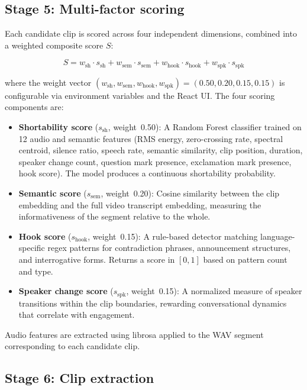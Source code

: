 \documentclass[ENG]{TFUOC}
\begin{document}
\subsection*{Stage 5: Multi-factor scoring}

Each candidate clip is scored across four independent dimensions, combined into a weighted composite score $S$:

\begin{equation}
S = w_{\text{sh}} \cdot s_{\text{sh}} + w_{\text{sem}} \cdot s_{\text{sem}} + w_{\text{hook}} \cdot s_{\text{hook}} + w_{\text{spk}} \cdot s_{\text{spk}}
\label{eq:scoring}
\end{equation}

where the weight vector $(w_{\text{sh}}, w_{\text{sem}}, w_{\text{hook}}, w_{\text{spk}}) = (0.50, 0.20, 0.15, 0.15)$ is configurable via environment variables and the React UI. The four scoring components are:

\begin{itemize}
\item \textbf{Shortability score} ($s_{\text{sh}}$, weight~0.50): A Random Forest classifier \cite{breiman2001rf} trained on 12 audio and semantic features (RMS energy, zero-crossing rate, spectral centroid, silence ratio, speech rate, semantic similarity, clip position, duration, speaker change count, question mark presence, exclamation mark presence, hook score). The model produces a continuous shortability probability.
\item \textbf{Semantic score} ($s_{\text{sem}}$, weight~0.20): Cosine similarity between the clip embedding and the full video transcript embedding, measuring the informativeness of the segment relative to the whole.
\item \textbf{Hook score} ($s_{\text{hook}}$, weight~0.15): A rule-based detector matching language-specific regex patterns for contradiction phrases, announcement structures, and interrogative forms. Returns a score in $[0,1]$ based on pattern count and type.
\item \textbf{Speaker change score} ($s_{\text{spk}}$, weight~0.15): A normalized measure of speaker transitions within the clip boundaries, rewarding conversational dynamics that correlate with engagement.
\end{itemize}

Audio features are extracted using librosa \cite{mcfee2015librosa} applied to the WAV segment corresponding to each candidate clip.

\subsection*{Stage 6: Clip extraction}
\end{document}
